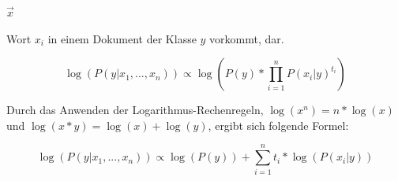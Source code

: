 $\vec{x}$ %

Wort $x_i$ in einem Dokument der Klasse $y$ vorkommt, dar. %


\begin{equation}
    \operatorname{log}(P(y|x_1, ..., x_n))\propto{}\operatorname{log}(P(y)*\prod_{i=1}^{n}P(x_i|y)^{t_i})
\end{equation}

Durch das Anwenden der Logarithmus-Rechenregeln, $\operatorname{log}(x^n) = n*\operatorname{log}(x)$ und $\operatorname{log}(x*y)=\operatorname{log}(x)+\operatorname{log}(y)$, ergibt sich folgende Formel:

\begin{equation}
    \operatorname{log}(P(y|x_1, ..., x_n))\propto{}\operatorname{log}(P(y))+\sum_{i=1}^{n}{t_i}*\operatorname{log}(P(x_i|y))
\end{equation}

\clearpage %